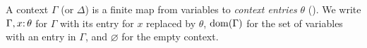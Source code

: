 

\begin{definition}[Context]
\label{def:context}
A context $\Gamma$ (or $\Delta$) is a finite map from variables to \emph{context entries} $\theta$
(). We write $\Gamma, x\mathord{:}\,\theta$ for $\Gamma$ with its entry for $x$ replaced by $\theta$,
$\mathrm{dom}(\Gamma)$ for the set of variables with an entry in $\Gamma$, and $\varnothing$ for the empty context.
\end{definition}
